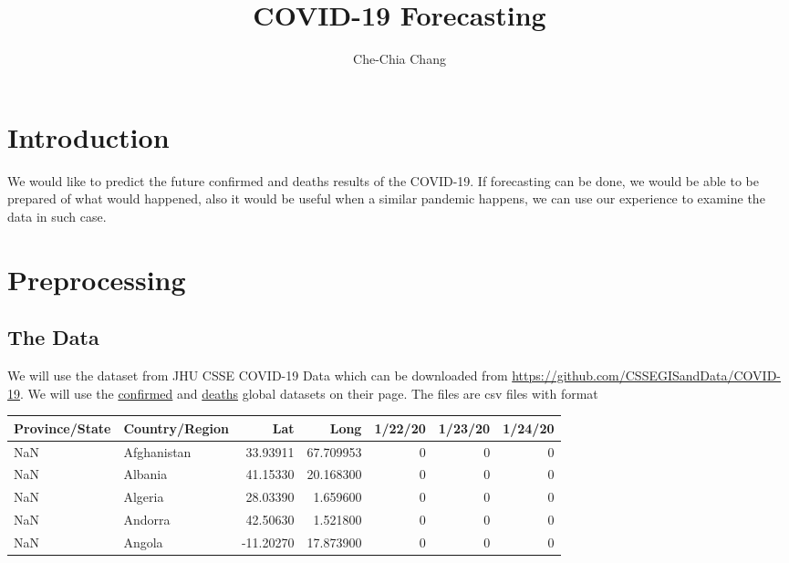\documentclass[a4paper,12pt]{article}
\begin{document}
\title{COVID-19 Forecasting}
\date{}
\author{Che-Chia Chang}

\maketitle

\section{Introduction}
We would like to predict the future confirmed and deaths results of the COVID-19. If forecasting can be done, we would be able to be prepared of what would happened, also it would be useful when a similar pandemic happens, we can use our experience to examine the data in such case.
\section{Preprocessing}
\subsection{The Data}
We will use the dataset from JHU CSSE COVID-19 Data which can be downloaded from \href{https://github.com/CSSEGISandData/COVID-19}{https://github.com/CSSEGISandData/COVID-19}. We will use the \href{https://github.com/CSSEGISandData/COVID-19/blob/master/csse_covid_19_data/csse_covid_19_time_series/time_series_covid19_confirmed_global.csv}{confirmed} and \href{https://github.com/CSSEGISandData/COVID-19/blob/master/csse_covid_19_data/csse_covid_19_time_series/time_series_covid19_deaths_global.csv}{deaths} global datasets on their page. The files are csv files with format

\begin{tabular}{llrrrrr}
        \toprule
        Province/State & Country/Region &       Lat &       Long &  1/22/20 &  1/23/20 &  1/24/20 \\
        \midrule
                   NaN &    Afghanistan &  33.93911 &  67.709953 &        0 &        0 &        0 \\
                   NaN &        Albania &  41.15330 &  20.168300 &        0 &        0 &        0 \\
                   NaN &        Algeria &  28.03390 &   1.659600 &        0 &        0 &        0 \\
                   NaN &        Andorra &  42.50630 &   1.521800 &        0 &        0 &        0 \\
                   NaN &         Angola & -11.20270 &  17.873900 &        0 &        0 &        0 \\
        \bottomrule
\end{tabular}
\end{document}
